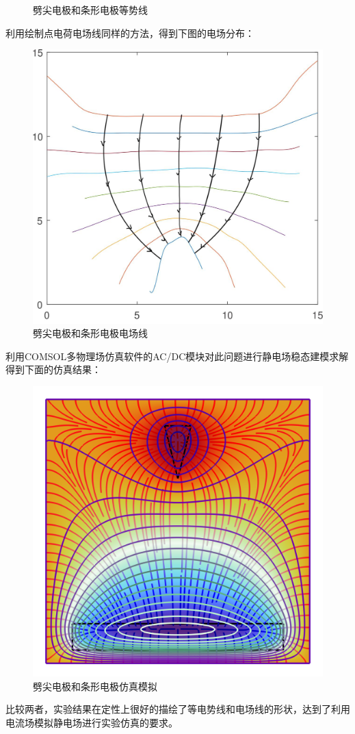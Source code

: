 \documentclass{WHUReport}
\begin{document}
\begin{multicols}{2}
\begin{figure}[H]
		\caption{劈尖电极和条形电极等势线}
	\end{figure}
	利用绘制点电荷电场线同样的方法，得到下图的电场分布：
	\begin{figure}[H]
		\centering
		\includegraphics[width=0.8\linewidth]{figs/wedge_e.jpg}
		\caption{劈尖电极和条形电极电场线}
	\end{figure}
	利用COMSOL多物理场仿真软件的AC/DC模块对此问题进行静电场稳态建模求解得到下面的仿真结果：
	\begin{figure}[H]
		\centering
		\includegraphics[width=0.85\linewidth]{figs/wedge.png}
		\caption{劈尖电极和条形电极仿真模拟}
	\end{figure}
	比较两者，实验结果在定性上很好的描绘了等电势线和电场线的形状，达到了利用电流场模拟静电场进行实验仿真的要求。

\end{multicols}
\end{document}
